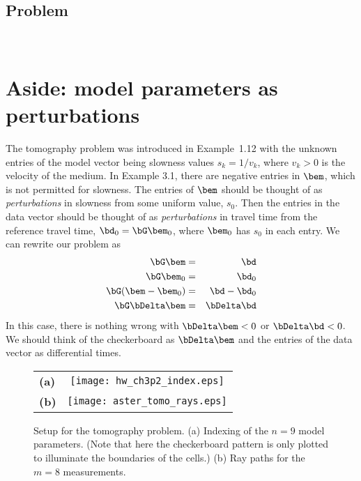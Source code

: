 \documentclass[11pt,titlepage,fleqn]{article}
\begin{document}

\subsection*{Problem} \howmuchtime\

\pagebreak

\nocite{Aster}



\appendix

\section{Aside: model parameters as perturbations}
\label{sec:pert}

The tomography problem was introduced in Example~1.12 with the unknown entries of the model vector being slowness values $s_k = 1/v_k$, where $v_k > 0$ is the velocity of the medium. In \citet{Aster} Example 3.1, there are negative entries in $\bem$, which is not permitted for slowness. The entries of $\bem$ should be thought of as {\em perturbations} in slowness from some uniform value, $s_0$. Then the entries in the data vector should be thought of as {\em perturbations} in travel time from the reference travel time, $\bd_0 = \bG\bem_0$, where $\bem_0$ has $s_0$ in each entry. We can rewrite our problem as
%
\begin{eqnarray}
\bG\bem &=& \bd
\\
\bG\bem_0 &=& \bd_0
\\
\bG(\bem - \bem_0) &=& \bd - \bd_0
\\
\bG\bDelta\bem &=& \bDelta\bd
\end{eqnarray}
%
In this case, there is nothing wrong with $\bDelta\bem < 0$ or $\bDelta\bd < 0$. We should think of the checkerboard as $\bDelta\bem$ and the entries of the data vector as differential times.



\begin{figure}[h]
\centering
\begin{tabular}{lc}
{\bf(a)} & \texttt{[image: hw\_ch3p2\_index.eps]} \\
{\bf(b)} & \texttt{[image: aster\_tomo\_rays.eps]} \\
\end{tabular}
\caption[]
{{
Setup for the tomography problem.
(a) Indexing of the $n=9$ model parameters.
(Note that here the checkerboard pattern is only plotted to illuminate the boundaries of the cells.)
(b) Ray paths for the $m=8$ measurements.
\label{fig:index}
}}
\end{figure} 


\end{document}
